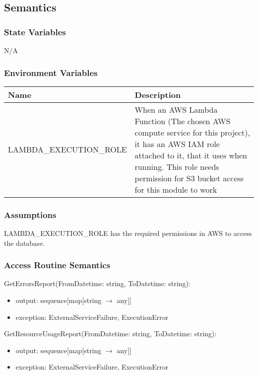 \documentclass[12pt, titlepage]{article}
\begin{document}
\subsection{Semantics}

\subsubsection{State Variables}

N/A
\subsubsection{Environment Variables}
\begin{center}
  \begin{tabular}{p{6cm} p{10cm}}
    \hline
    \textbf{Name} & \textbf{Description} \\
    \hline
    LAMBDA\_EXECUTION\_ROLE & When an AWS Lambda Function (The chosen
    AWS compute service for this project), it has an AWS IAM role
    attached to it, that it uses when running. This role needs
    permission for S3 bucket access for this module to work \\
    \hline
  \end{tabular}
\end{center}

\subsubsection{Assumptions}

LAMBDA\_EXECUTION\_ROLE has the required permissions in AWS to access
the database.

\subsubsection{Access Routine Semantics}
\noindent GetErrorsReport(FromDatetime: string, ToDatetime: string):
\begin{itemize}
  \item output: sequence[map[string $\rightarrow$ any]]
  \item exception: ExternalServiceFailure, ExecutionError
\end{itemize}

\noindent GetResourceUsageReport(FromDatetime: string, ToDatetime: string):
\begin{itemize}
  \item output: sequence[map[string $\rightarrow$ any]]
  \item exception: ExternalServiceFailure, ExecutionError
\end{itemize}
\end{document}
